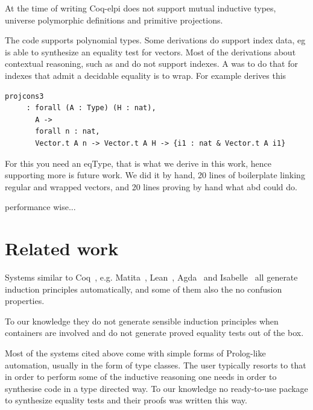 \documentclass[sigplan,10pt,review]{acmart}\settopmatter{printfolios=true,printccs=false,printacmref=false}
\newcommand{\derive}[1]{\keys{#1}}
\begin{document}
At the time of writing Coq-elpi does not support mutual inductive
types, universe polymorphic definitions and primitive projections.

The code supports polynomial types. Some derivations do
support index data, eg \derive{eq} is able to synthesize
an equality test for vectors. Most of the derivations about
contextual reasoning, such as \derive{eqK} and \derive{bcongr}
do not support indexes. A was to do that for indexes that admit a
decidable equality is to wrap. For example \derive{projK} derives
this

\begin{minipage}{\textwidth}\begin{lstlisting}
projcons3
     : forall (A : Type) (H : nat),
       A ->
       forall n : nat,
       Vector.t A n -> Vector.t A H -> {i1 : nat & Vector.t A i1}
\end{lstlisting}\end{minipage}

\noindent
For this you need an eqType, that is what we derive in this work,
hence supporting more is future work. We did it by hand, 20 lines of
boilerplate linking regular and wrapped vectors, and 20 lines proving
by hand what \derive{eqK} abd \derive{bcongr} could do.

performance wise...

\section{Related work} %
\label{sec:related}

Systems similar to Coq~\cite{the_coq_development_team_2018_1219885},
e.g. Matita~\cite{10.1007/978-3-642-22438-6_7},
Lean~\cite{10.1007/978-3-319-21401-6_26}, Agda~\cite{norell:thesis} and
Isabelle~\cite{Nipkow:2002:IPA:1791547} all generate
induction principles automatically, and some of them also the
no confusion properties. 

To our knowledge they do not generate sensible induction principles
when containers are involved and do not generate proved equality tests
out of the box.

Most of the systems cited above come with simple forms of Prolog-like
automation, usually in the form of type classes. The user typically
resorts to that in order to perform some of the inductive reasoning
one needs in order to synthesise code in a type directed way.
To our knowledge no ready-to-use package to synthesize equality tests
and their proofs was written this way.
\end{document}
